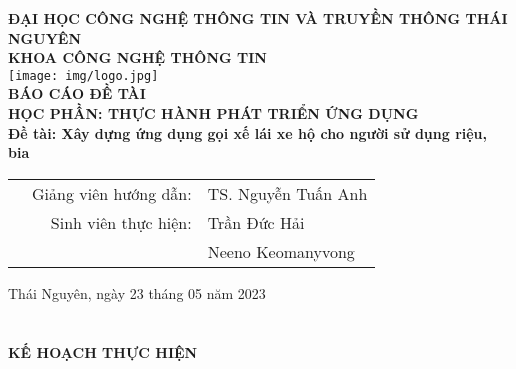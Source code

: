 \documentclass[a4paper,13pt]{report}
\numberwithin{figure}{chapter}
\numberwithin{figure}{section}
\newcommand{\university}{ĐẠI HỌC CÔNG NGHỆ THÔNG TIN VÀ TRUYỀN THÔNG THÁI NGUYÊN}
\newcommand{\faculty}{ KHOA CÔNG NGHỆ THÔNG TIN}
\newcommand{\baocao}{ BÁO CÁO ĐỀ TÀI}
\newcommand{\course}{HỌC PHẦN: THỰC HÀNH PHÁT TRIỂN ỨNG DỤNG}
\newcommand{\mytitle}{Đề tài: Xây dựng ứng dụng gọi xế lái xe hộ cho người sử dụng riệu, bia}
\newcommand{\mydate}{Thái Nguyên, ngày 23 tháng 05 năm 2023}
\begin{document}
\begin{titlepage}
    \begin{mdframed}[linewidth=2pt, linecolor=black]
    \begin{center}
        {\LARGE\textbf{\university}}\\[0.5cm]
        {\Large\textbf{\faculty}}\\[1.0cm]
        \texttt{[image: img/logo.jpg]}\\[1.0cm]
        {\LARGE\textbf{\baocao}}\\[0.5cm]
        {\Large\textbf{\course}}\\[0.5cm]
        {\Large\textbf{\mytitle}}\\[2.5cm]
    \end{center}
    \begin{table}[H]
        \begin{tabular}{rrl}
        \hspace{7 cm} & Giảng viên hướng dẫn: & TS. Nguyễn Tuấn Anh\\[0.5cm]
        & Sinh viên thực hiện: & Trần Đức Hải \\
        & & Neeno Keomanyvong \\
        \end{tabular}
        \end{table}
        \vspace{4.0cm}
        \begin{center}
        {\footnotesize \mydate}
        \end{center}
    \end{mdframed}
\end{titlepage}

\section*{}

\newpage



\begin{center}
    \Large\textbf{KẾ HOẠCH THỰC HIỆN} \\
\end{center}
\end{document}
